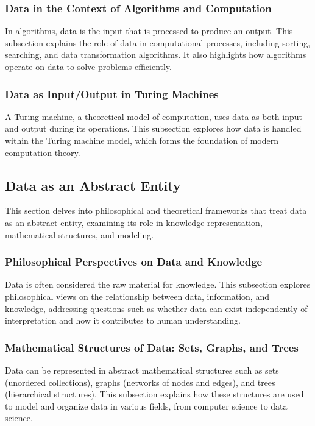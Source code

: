 \documentclass[12pt, oneside]{book}
\begin{document}
\subsubsection{Data in the Context of Algorithms and Computation}
In algorithms, data is the input that is processed to produce an output. This subsection explains the role of data in computational processes, including sorting, searching, and data transformation algorithms. It also highlights how algorithms operate on data to solve problems efficiently.

\subsubsection{Data as Input/Output in Turing Machines}
A Turing machine, a theoretical model of computation, uses data as both input and output during its operations. This subsection explores how data is handled within the Turing machine model, which forms the foundation of modern computation theory.

\subsection{Data as an Abstract Entity}
This section delves into philosophical and theoretical frameworks that treat data as an abstract entity, examining its role in knowledge representation, mathematical structures, and modeling.

\subsubsection{Philosophical Perspectives on Data and Knowledge}
Data is often considered the raw material for knowledge. This subsection explores philosophical views on the relationship between data, information, and knowledge, addressing questions such as whether data can exist independently of interpretation and how it contributes to human understanding.

\subsubsection{Mathematical Structures of Data: Sets, Graphs, and Trees}
Data can be represented in abstract mathematical structures such as sets (unordered collections), graphs (networks of nodes and edges), and trees (hierarchical structures). This subsection explains how these structures are used to model and organize data in various fields, from computer science to data science.
\end{document}
